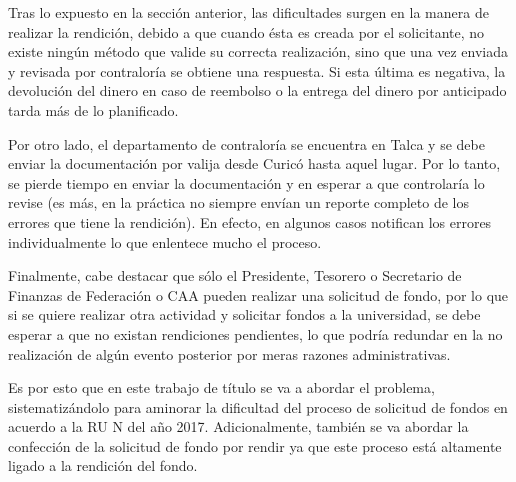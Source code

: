 Tras lo expuesto en la sección anterior, las dificultades surgen en la manera de realizar la rendición, debido a que cuando ésta es creada por el solicitante, no existe ningún método que valide su correcta realización, sino que una vez enviada y revisada por contraloría se obtiene una respuesta. Si esta última es negativa, la devolución del dinero en caso de reembolso o la entrega del dinero por anticipado tarda más de lo planificado.

Por otro lado, el departamento de contraloría se encuentra en Talca y se debe enviar la documentación por valija desde Curicó hasta aquel lugar. Por lo tanto, se pierde tiempo en enviar la documentación y en esperar a que controlaría lo revise (es más, en la práctica no siempre envían un reporte completo de los errores que tiene la rendición). En efecto, en algunos casos notifican los errores individualmente lo que enlentece mucho el proceso.

Finalmente, cabe destacar que sólo el Presidente, Tesorero o Secretario de Finanzas de Federación o CAA pueden realizar una solicitud de fondo, por lo que si se quiere realizar otra actividad y solicitar fondos a la universidad, se debe esperar a que no existan rendiciones pendientes, lo que podría redundar en la no realización de algún evento posterior por meras razones administrativas.

Es por esto que en este trabajo de título se va a abordar el problema, sistematizándolo para aminorar la dificultad del proceso de solicitud de fondos en acuerdo a la RU N del año 2017. Adicionalmente, también se va abordar la confección de la solicitud de fondo por rendir ya que este proceso está altamente ligado a la rendición del fondo.
